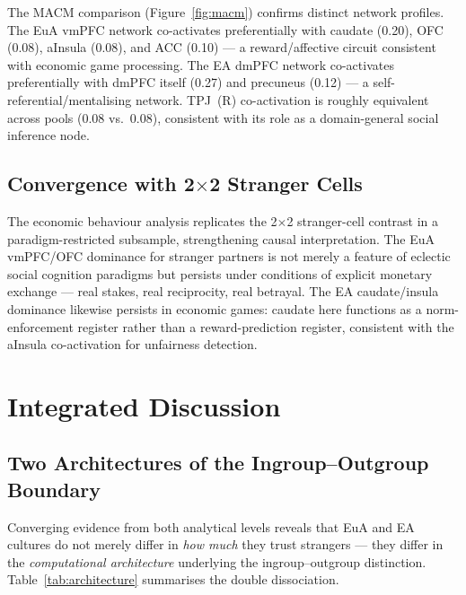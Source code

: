 \documentclass[11pt,a4paper]{article}
\begin{document}
The MACM comparison (Figure~\ref{fig:macm}) confirms distinct network profiles. The EuA
vmPFC network co-activates preferentially with caudate (0.20), OFC (0.08), aInsula (0.08),
and ACC (0.10) — a reward/affective circuit consistent with economic game processing. The
EA dmPFC network co-activates preferentially with dmPFC itself (0.27) and precuneus (0.12)
— a self-referential/mentalising network. TPJ~(R) co-activation is roughly equivalent across
pools (0.08 vs.\ 0.08), consistent with its role as a domain-general social inference node.

\subsection{Convergence with 2$\times$2 Stranger Cells}

The economic behaviour analysis replicates the 2$\times$2 stranger-cell contrast in a
paradigm-restricted subsample, strengthening causal interpretation. The EuA vmPFC/OFC
dominance for stranger partners is not merely a feature of eclectic social cognition paradigms
but persists under conditions of explicit monetary exchange — real stakes, real reciprocity,
real betrayal. The EA caudate/insula dominance likewise persists in economic games: caudate
here functions as a norm-enforcement register rather than a reward-prediction register,
consistent with the aInsula co-activation for unfairness detection.

\section{Integrated Discussion}

\subsection{Two Architectures of the Ingroup--Outgroup Boundary}

Converging evidence from both analytical levels reveals that EuA and EA cultures do not
merely differ in \emph{how much} they trust strangers — they differ in the \emph{computational
architecture} underlying the ingroup--outgroup distinction. Table~\ref{tab:architecture}
summarises the double dissociation.
\end{document}
